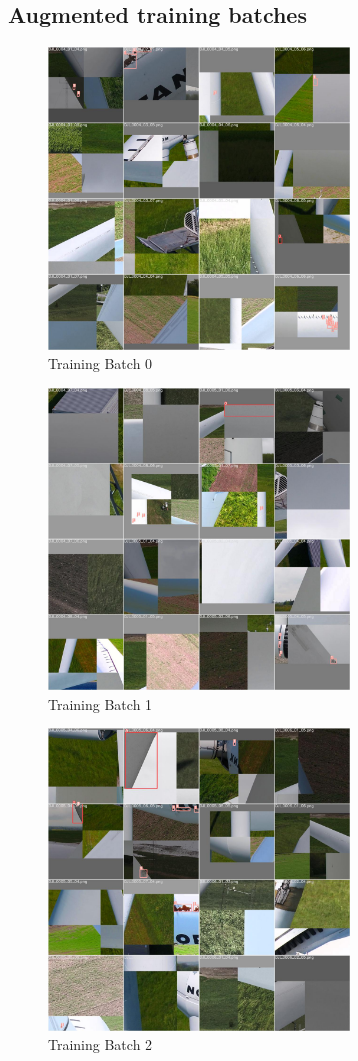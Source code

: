 \documentclass[conference]{IEEEtran}
\begin{document}
\subsection{Augmented training batches}
\begin{figure}[H]
    \centering
    \includegraphics[width=8cm]{Images/YOLOv5L/train_batch0.jpg}
    \caption{Training Batch 0}
\end{figure}
\begin{figure}[H]
    \centering
    \includegraphics[width=8cm]{Images/YOLOv5L/train_batch1.jpg}
    \caption{Training Batch 1}
\end{figure}
\begin{figure}[H]
    \centering
    \includegraphics[width=8cm]{Images/YOLOv5L/train_batch2.jpg}
    \caption{Training Batch 2}
\end{figure}
\end{document}
